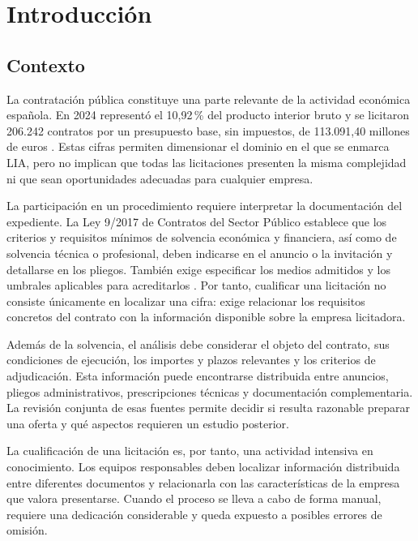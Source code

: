 \chapter{Introducción}
\label{chap:introduction}

\section{Contexto}

La contratación pública constituye una parte relevante de la actividad
económica española. En 2024 representó el 10,92\,\% del producto interior bruto
y se licitaron 206.242 contratos por un presupuesto base, sin impuestos, de
113.091,40 millones de euros \cite{oirescon2025}. Estas cifras permiten
dimensionar el dominio en el que se enmarca LIA, pero no implican que todas las
licitaciones presenten la misma complejidad ni que sean oportunidades adecuadas
para cualquier empresa.

La participación en un procedimiento requiere interpretar la documentación del
expediente. La Ley 9/2017 de Contratos del Sector Público establece que los
criterios y requisitos mínimos de solvencia económica y financiera, así como de
solvencia técnica o profesional, deben indicarse en el anuncio o la invitación y
detallarse en los pliegos. También exige especificar los medios admitidos y los
umbrales aplicables para acreditarlos \cite{lcsp2017}. Por tanto, cualificar una
licitación no consiste únicamente en localizar una cifra: exige relacionar los
requisitos concretos del contrato con la información disponible sobre la
empresa licitadora.

Además de la solvencia, el análisis debe considerar el objeto del contrato, sus
condiciones de ejecución, los importes y plazos relevantes y los criterios de
adjudicación. Esta información puede encontrarse distribuida entre anuncios,
pliegos administrativos, prescripciones técnicas y documentación
complementaria. La revisión conjunta de esas fuentes permite decidir si resulta
razonable preparar una oferta y qué aspectos requieren un estudio posterior.

La cualificación de una licitación es, por tanto, una actividad intensiva en
conocimiento. Los equipos responsables deben localizar información distribuida
entre diferentes documentos y relacionarla con las características de la
empresa que valora presentarse. Cuando el proceso se lleva a cabo de forma
manual, requiere una dedicación considerable y queda expuesto a posibles
errores de omisión.

